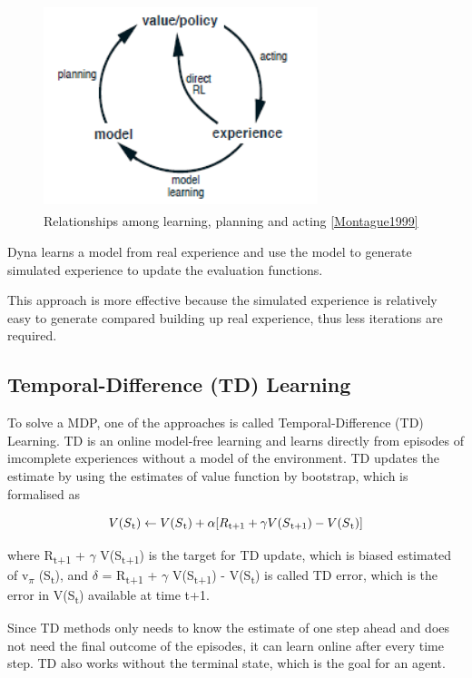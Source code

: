 \documentclass[12pt,twoside]{report}
\begin{document}
\begin{figure}[!htb]
\centering
\includegraphics[width=8cm, height=6cm]{./figures/dyna}
\caption{Relationships among learning, planning and acting \ref{Montague1999}}
\label{dyna}
\end{figure}

Dyna learns a model from real experience and use the model to generate simulated experience to update the evaluation functions.

This approach is more effective because the simulated experience is relatively easy to generate compared building up real experience, thus less iterations are required.

\subsection{Temporal-Difference (TD) Learning}

To solve a MDP, one of the approaches is called Temporal-Difference (TD) Learning.
TD is an online model-free learning and learns directly from episodes of imcomplete experiences without a model of the environment.
TD updates the estimate by using the estimates of value function by bootstrap, which is formalised as

\begin{equation}
\centering
V(S\textsubscript{t}) \leftarrow V(S\textsubscript{t}) + \alpha[R\textsubscript{t+1} + \gamma V(S\textsubscript{t+1}) - V(S\textsubscript{t})]
\end{equation}

where R\textsubscript{t+1} + $\gamma$ V(S\textsubscript{t+1}) is the target for TD update, which is biased estimated of v\textsubscript{$\pi$} (S\textsubscript{t}), and $\delta$ = R\textsubscript{t+1} + $\gamma$ V(S\textsubscript{t+1}) - V(S\textsubscript{t}) is called TD error, which is the error in V(S\textsubscript{t}) available at time t+1.

Since TD methods only needs to know the estimate of one step ahead and does not need the final outcome of the episodes, it can learn online after every time step. TD also works without the terminal state, which is the goal for an agent.
\end{document}
